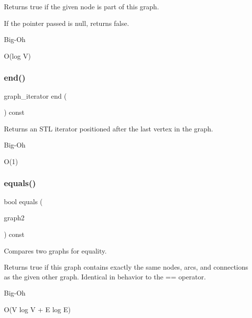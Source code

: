 Returns true if the given node is part of this graph. 

If the pointer passed is null, returns false. \begin{DoxyRefDesc}{Big-\/\+Oh}
\item[\mbox{\hyperlink{BigOh__BigOh000057}{Big-\/\+Oh}}]O(log V) \end{DoxyRefDesc}
\mbox{\label{classGraph_afcdf62cae5d7e50644957d66f886742d}} 
\subsubsection{\texorpdfstring{end()}{end()}}
{\footnotesize\ttfamily graph\+\_\+iterator end (\begin{DoxyParamCaption}{ }\end{DoxyParamCaption}) const\hspace{0.3cm}{\ttfamily [inline]}}



Returns an S\+TL iterator positioned after the last vertex in the graph. 

\begin{DoxyRefDesc}{Big-\/\+Oh}
\item[\mbox{\hyperlink{BigOh__BigOh000092}{Big-\/\+Oh}}]O(1) \end{DoxyRefDesc}
\mbox{\label{classGraph_a6bec43eb3dfdf3d23eb328b406edf44a}} 
\subsubsection{\texorpdfstring{equals()}{equals()}}
{\footnotesize\ttfamily bool equals (\begin{DoxyParamCaption}\item[{const \mbox{\hyperlink{classGraph}{Graph}}$<$ Node\+Type, Arc\+Type $>$ \&}]{graph2 }\end{DoxyParamCaption}) const}



Compares two graphs for equality. 

Returns {\ttfamily true} if this graph contains exactly the same nodes, arcs, and connections as the given other graph. Identical in behavior to the == operator. \begin{DoxyRefDesc}{Big-\/\+Oh}
\item[\mbox{\hyperlink{BigOh__BigOh000058}{Big-\/\+Oh}}]O(V log V + E log E) \end{DoxyRefDesc}
\mbox{\label{classGraph_a7b7c2c1738f8e7faf84c54d7642992fa}} 
